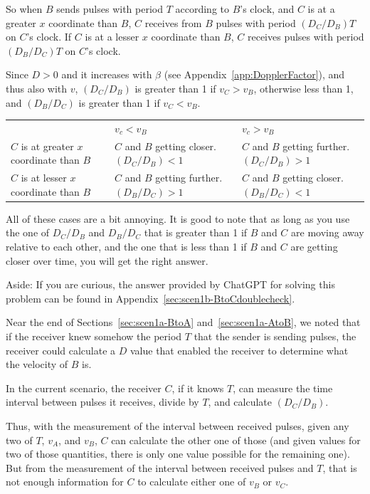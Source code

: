 \documentclass[a4paper]{article}
\theoremstyle{plain}
\theoremstyle{definition}
\begin{document}
So when $B$ sends pulses with period $T$ according to $B$'s clock, and
$C$ is at a greater $x$ coordinate than $B$, $C$ receives from $B$
pulses with period $(D_C / D_B) T$ on $C$'s clock.  If $C$ is at a
lesser $x$ coordinate than $B$, $C$ receives pulses with period
$(D_B / D_C) T$ on $C$'s clock.

Since $D > 0$ and it increases with $\beta$ (see
Appendix~\ref{app:DopplerFactor}), and thus also with $v$,
$(D_C / D_B)$ is greater than 1 if $v_C > v_B$, otherwise less than 1,
and $(D_B / D_C)$ is greater than 1 if $v_C < v_B$.

\begin{tabularx}{1.0\textwidth}{|p{4cm}|p{4cm}|p{4cm}|}
\cline{1-3} \\
       & $v_c < v_B$ & $v_c > v_B$ \\ \cline{1-3}
$C$ is at greater $x$ coordinate than $B$ & $C$ and $B$ getting closer.  $(D_C / D_B) < 1$ & $C$ and $B$ getting further.  $(D_C / D_B) > 1$ \\ \cline{1-3}
$C$ is at lesser $x$ coordinate than $B$ & $C$ and $B$ getting further.  $(D_B / D_C) > 1$ & $C$ and $B$ getting closer.  $(D_B / D_C) < 1$ \\ \cline{1-3}
\end{tabularx}

All of these cases are a bit annoying.  It is good to note that as
long as you use the one of $D_C / D_B$ and $D_B / D_C$ that is greater
than 1 if $B$ and $C$ are moving away relative to each other, and the
one that is less than 1 if $B$ and $C$ are getting closer over time,
you will get the right answer.

Aside: If you are curious, the answer provided by ChatGPT for solving
this problem can be found in Appendix~\ref{sec:scen1b-BtoCdoublecheck}.

Near the end of Sections~\ref{sec:scen1a-BtoA} and~\ref{sec:scen1a-AtoB},
we noted that if the receiver knew somehow the period $T$ that the
sender is sending pulses, the receiver could calculate a $D$ value
that enabled the receiver to determine what the velocity of $B$ is.

In the current scenario, the receiver $C$, if it knows $T$, can
measure the time interval between pulses it receives, divide by $T$,
and calculate $(D_C / D_B)$.

Thus, with the measurement of the interval between received pulses,
given any two of $T$, $v_A$, and $v_B$, $C$ can calculate the other
one of those (and given values for two of those quantities, there is
only one value possible for the remaining one).
But from the measurement of the interval between received pulses and
$T$, that is not enough information for $C$ to calculate either one of
$v_B$ or $v_C$.
\end{document}
